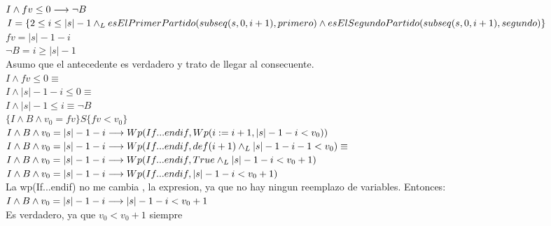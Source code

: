 \documentclass[10pt,a4paper]{article}
\begin{document}
\begin{enumerate}
\vspace{0.3cm}
\\
\underline{$I\land fv \leq 0 \longrightarrow \neg B$}
\vspace{0.3cm}
\\
$I = \{ 2\leq i \leq|s|-1 \land _L esElPrimerPartido(subseq(s, 0, i+1), primero) \land esElSegundoPartido(subseq(s, 0, i+1), segundo)\}$
\vspace{0.3cm}
\\
$fv = |s|- 1 -i$
\vspace{0.3cm}
\\
$\neg B = i \geq |s| - 1$
\vspace{0.3cm}
\\
Asumo que el antecedente es verdadero y trato de llegar al consecuente.
\vspace{0.3cm}
\\
$I \land fv \leq 0 \equiv$
\vspace{0.3cm}
\\
$I \land |s|-1-i \leq 0 \equiv$
\vspace{0.3cm}
\\
$I \land |s|-1 \leq i \equiv \neg B$
\vspace{0.3cm}
\\
\underline{$\{I\land B \land v_0 = fv\} S \{fv < v_0\}$}
\vspace{0.3cm}
\\
$I\land B \land v_0 = |s| - 1 - i \longrightarrow Wp(If...endif, Wp(i:= i+1, |s|-1 - i < v_0))$ 
\vspace{0.3cm}
\\
$I\land B \land v_0 = |s| - 1 - i \longrightarrow Wp(If...endif, def(i+1)\land _L |s| -1 -i - 1 < v_0)\equiv$
\vspace{0.3cm}
\\
$I\land B \land v_0 = |s| - 1 - i \longrightarrow Wp(If...endif, True\land _L |s| -1 -i < v_0 + 1)$ 
\vspace{0.3cm}
\\
$I\land B \land v_0 = |s| - 1 - i \longrightarrow Wp(If...endif,|s| -1 -i < v_0 + 1)$ 
\vspace{0.3cm}
\\
La wp(If...endif) no me cambia , la expresion, ya que no hay ningun reemplazo de variables. Entonces:
\vspace{0.3cm}
\\
$I\land B \land v_0 = |s| - 1 - i \longrightarrow |s| -1 -i < v_0 + 1$
\vspace{0.3cm}
\\
Es verdadero, ya que $v_0 < v_0 + 1 $ siempre
\vspace{0.3cm}

\end{enumerate}
\end{document}
